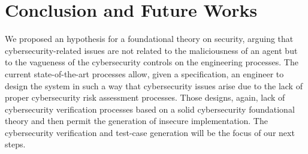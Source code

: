 \documentclass[conference]{IEEEtran}
\newcommand{\fixnote}[2]{\textbf{\color{red}{FIX}}\footnote{{\bf #1:} #2}}
\begin{document}
%

\section{Conclusion and Future Works}
We proposed an hypothesis for a foundational theory on security, arguing that
cybersecurity-related issues are not related to the maliciousness of an agent but to
the vagueness of the cybersecurity controls on the engineering processes.
The current state-of-the-art processes allow, given a specification,
an engineer to design the system in such a way that cybersecurity issues arise due to the lack
of proper cybersecurity risk assessment processes.
Those designs, again, lack of cybersecurity verification processes based on a solid 
cybersecurity foundational theory and then permit the generation of insecure implementation.
The cybersecurity verification and test-case generation will be the focus of our next steps.
\end{document}
